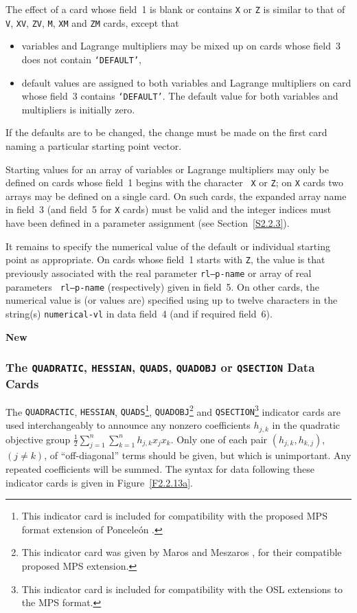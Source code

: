 \documentclass[a4paper]{article}
\newcommand{\sfrac}[2]{{\scriptstyle \frac{#1}{#2}}}
\newcommand{\half}{\sfrac{1}{2}}
\begin{document}
The effect of a card
whose field~1  is blank
or contains  {\tt X} or
{\tt Z} is similar to that of {\tt  V}, {\tt  XV}, {\tt  ZV}, {\tt M},
{\tt XM} and {\tt ZM} cards, except that
\begin{itemize}
\item
variables and Lagrange multipliers  may be mixed up  on   cards  whose
field~3 does not contain {\tt `DEFAULT'},
\item
default values
are assigned to both variables and Lagrange multipliers on card
whose field~3 contains {\tt `DEFAULT'}.  The default value for
both variables and multipliers is initially zero.
\end{itemize}

If  the defaults
are  to be  changed, the change  must be  made on the
first card naming a particular starting point vector.

Starting values for an array
of  variables or Lagrange multipliers may
only be defined on cards whose field~1 begins with  the character {\tt
X} or {\tt Z}; on {\tt X} cards two arrays may be  defined on a single
card.  On such cards, the expanded array  name
in field~3 (and field~5
for {\tt  X} cards)
must be  valid  and the integer indices  must have
been defined in a parameter assignment (see Section~\ref{S2.2.3}).

It remains to specify the numerical value of the default or individual
starting point  as appropriate.
On cards   whose field~1  starts with
{\tt  Z},  the value  is that   previously  associated  with the  real
parameter
{\tt rl--p-name}  or   array
of real  parameters  {\tt
rl--p-name} (respectively)  given in field~5.   On other cards, the
numerical value   is  (or values  are) specified using  up   to twelve
characters  in the string(s)  {\tt numerical-vl} in data field~4 (and
if required field~6).

{\bf New}
\subsubsection{\label{S2.2.13a}The 
{\tt QUADRATIC}, {\tt HESSIAN}, {\tt QUADS}, {\tt QUADOBJ} or {\tt QSECTION}
 Data Cards}

The {\tt QUADRACTIC}, {\tt HESSIAN}, 
{\tt QUADS}\footnote{This indicator card is included for compatibility with the 
proposed MPS format extension of Poncele\'{o}n \cite{Ponc:1990}.},
{\tt QUADOBJ}\footnote{This indicator card was given by Maros and Meszaros \cite{MaroMesa:1999},
for their compatible proposed MPS extension.}
and
{\tt QSECTION}\footnote{This indicator card is included for compatibility
with the OSL \cite{OSLQP:1998} extensions to the MPS format.}
indicator  cards are used interchangeably
to announce any nonzero coefficients ${h_{j,k}}$ in the quadratic 
objective group ${\half \sum_{j=1}^n \sum_{k=1}^n h_{j,k} x_j x_k }$.
Only one of each pair ${(h_{j,k}, h_{k,j})}$, ${(j \neq k)}$,
of ``off-diagonal'' terms should be given, 
but which is unimportant. Any repeated coefficients will be summed.
The  syntax  for  data  following   these indicator cards
is  given in Figure~\ref{F2.2.13a}.
\end{document}

